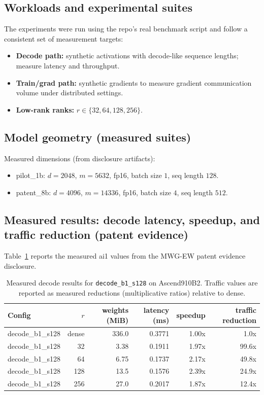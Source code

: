 \documentclass[11pt]{article}
\begin{document}
\subsection{Workloads and experimental suites}
The experiments were run using the repo’s real benchmark script and follow a consistent set of measurement targets:
\begin{itemize}[leftmargin=1.2em]
  \item \textbf{Decode path:} synthetic activations with decode-like sequence lengths; measure latency and throughput.
  \item \textbf{Train/grad path:} synthetic gradients to measure gradient communication volume under distributed settings.
  \item \textbf{Low-rank ranks:} $r\in\{32,64,128,256\}$.
\end{itemize}

\subsection{Model geometry (measured suites)}
Measured dimensions (from disclosure artifacts):
\begin{itemize}[leftmargin=1.2em]
  \item pilot\_1b: $d=2048$, $m=5632$, fp16, batch size $1$, seq length $128$.
  \item patent\_8b: $d=4096$, $m=14336$, fp16, batch size $4$, seq length $512$.
\end{itemize}

\subsection{Measured results: decode latency, speedup, and traffic reduction (patent evidence)}
Table~\ref{tab:decode_patent_evidence} reports the measured ai1 values from the MWG-EW patent evidence disclosure.

\begin{table}[t]
\centering
\caption{Measured decode results for \texttt{decode\_b1\_s128} on Ascend910B2. Traffic values are reported as measured reductions (multiplicative ratios) relative to dense.}
\label{tab:decode_patent_evidence}
\begin{tabular}{@{}lrrrrr@{}}
\toprule
Config & $r$ & weights (MiB) & latency (ms) & speedup & traffic reduction \\
\midrule
decode\_b1\_s128 & dense & 336.0 & 0.3771 & 1.00x & 1.0x \\
decode\_b1\_s128 & 32 & 3.38 & 0.1911 & 1.97x & 99.6x \\
decode\_b1\_s128 & 64 & 6.75 & 0.1737 & 2.17x & 49.8x \\
decode\_b1\_s128 & 128 & 13.5 & 0.1576 & 2.39x & 24.9x \\
decode\_b1\_s128 & 256 & 27.0 & 0.2017 & 1.87x & 12.4x \\
\bottomrule
\end{tabular}
\end{table}
\end{document}
